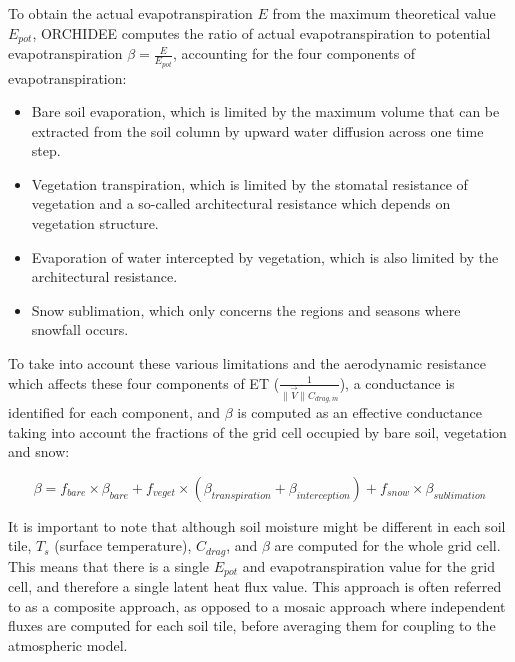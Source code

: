 To obtain the actual evapotranspiration $E$ from the maximum theoretical value $E_{pot}$, ORCHIDEE computes the ratio of actual evapotranspiration to potential evapotranspiration $\beta = \frac{E}{E_{pot}}$, accounting for the four components of evapotranspiration:  

\begin{itemize}
    \item Bare soil evaporation, which is limited by the maximum volume that can be extracted from the soil column by upward water diffusion across one time step.
    \item Vegetation transpiration, which is limited by the stomatal resistance of vegetation and a so-called architectural resistance which depends on vegetation structure.
    \item Evaporation of water intercepted by vegetation, which is also limited by the architectural resistance.
    \item Snow sublimation, which only concerns the regions and seasons where snowfall occurs.
\end{itemize}

To take into account these various limitations and the aerodynamic resistance which affects these four components of ET ($\frac{1}{\lVert \vec{V} \rVert C_{drag, m}}$), a conductance is identified for each component, and $\beta$ is computed as an effective conductance taking into account the fractions of the grid cell occupied by bare soil, vegetation and snow:

\begin{equation}
    \beta = f_{bare} \times \beta_{bare} + f_{veget} \times ( \beta_{transpiration} + \beta_{interception} ) + f_{snow} \times  \beta_{sublimation}
\end{equation}

It is important to note that although soil moisture might be different in each soil tile, $T_s$ (surface temperature), $C_{drag}$, and $\beta$ are computed for the whole grid cell. This means that there is a single $E_{pot}$ and evapotranspiration value for the grid cell, and therefore a single latent heat flux value.
This approach is often referred to as a composite approach, as opposed to a mosaic approach where independent fluxes are computed for each soil tile, before averaging them for coupling to the atmospheric model. 


